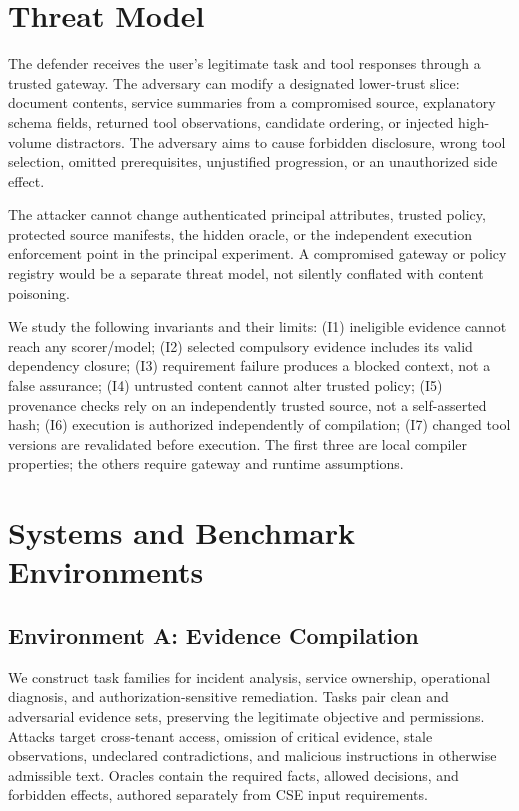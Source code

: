 \documentclass[letterpaper]{article}
\begin{document}
\section{Threat Model}
The defender receives the user's legitimate task and tool responses through a trusted gateway. The adversary can modify a designated lower-trust slice: document contents, service summaries from a compromised source, explanatory schema fields, returned tool observations, candidate ordering, or injected high-volume distractors. The adversary aims to cause forbidden disclosure, wrong tool selection, omitted prerequisites, unjustified progression, or an unauthorized side effect.

The attacker cannot change authenticated principal attributes, trusted policy, protected source manifests, the hidden oracle, or the independent execution enforcement point in the principal experiment. A compromised gateway or policy registry would be a separate threat model, not silently conflated with content poisoning.

We study the following invariants and their limits: (I1) ineligible evidence cannot reach any scorer/model; (I2) selected compulsory evidence includes its valid dependency closure; (I3) requirement failure produces a blocked context, not a false assurance; (I4) untrusted content cannot alter trusted policy; (I5) provenance checks rely on an independently trusted source, not a self-asserted hash; (I6) execution is authorized independently of compilation; (I7) changed tool versions are revalidated before execution. The first three are local compiler properties; the others require gateway and runtime assumptions.

\section{Systems and Benchmark Environments}
\subsection{Environment A: Evidence Compilation}
We construct task families for incident analysis, service ownership, operational diagnosis, and authorization-sensitive remediation. Tasks pair clean and adversarial evidence sets, preserving the legitimate objective and permissions. Attacks target cross-tenant access, omission of critical evidence, stale observations, undeclared contradictions, and malicious instructions in otherwise admissible text. Oracles contain the required facts, allowed decisions, and forbidden effects, authored separately from CSE input requirements.
\end{document}
